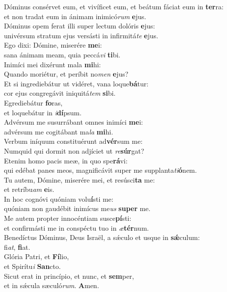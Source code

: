 \evenverse Dóminus consérvet eum, et vivíficet eum, et beátum fáciat eum in \textbf{ter}ra:~\*\\
\evenverse et non tradat eum in ánimam inimicó\textit{rum} \textbf{e}jus.\\
\oddverse Dóminus opem ferat illi super lectum dolóris \textbf{e}jus:~\*\\
\oddverse univérsum stratum ejus versásti in infirmitá\textit{te} \textbf{e}jus.\\
\evenverse Ego dixi: Dómine, miserére \textbf{me}i:~\*\\
\evenverse sana ánimam meam, quia peccá\textit{vi} \textbf{ti}bi.\\
\oddverse Inimíci mei dixérunt mala \textbf{mi}hi:~\*\\
\oddverse Quando moriétur, et períbit no\textit{men} \textbf{e}jus?\\
\evenverse Et si ingrediebátur ut vidéret, vana loque\textbf{bá}tur:~\*\\
\evenverse cor ejus congregávit iniquitá\textit{tem} \textbf{si}bi.\\
\oddverse Egrediebátur \textbf{fo}ras,~\*\\
\oddverse et loquebátur in \textit{i}\textbf{dí}psum.\\
\evenverse Advérsum me susurrábant omnes inimíci \textbf{me}i:~\*\\
\evenverse advérsum me cogitábant ma\textit{la} \textbf{mi}hi.\\
\oddverse Verbum iníquum constituérunt ad\textbf{vér}sum me:~\*\\
\oddverse Numquid qui dormit non adjíciet ut \textit{re}\textbf{súr}gat?\\
\evenverse Etenim homo pacis meæ, in quo spe\textbf{rá}vi:~\*\\
\evenverse qui edébat panes meos, magnificávit super me supplanta\textit{ti}\textbf{ó}nem.\\
\oddverse Tu autem, Dómine, miserére mei, et resúsci\textbf{ta} me:~\*\\
\oddverse et retríbu\textit{am} \textbf{e}is.\\
\evenverse In hoc cognóvi quóniam volu\textbf{í}sti me:~\*\\
\evenverse quóniam non gaudébit inimícus me\textit{us} \textbf{su}\textbf{per} me.\\
\oddverse Me autem propter innocéntiam susce\textbf{pí}sti:~\*\\
\oddverse et confirmásti me in conspéctu tuo in \textit{æ}\textbf{tér}num.\\
\evenverse Benedíctus Dóminus, Deus Israël, a sǽculo et usque in \textbf{sǽ}culum:~\*\\
\evenverse fi\textit{at}, \textbf{fi}at.\\
\oddverse Glória Patri, et \textbf{Fí}lio,~\*\\
\oddverse et Spirítu\textit{i} \textbf{San}cto.\\
\evenverse Sicut erat in princípio, et nunc, et \textbf{sem}per,~\*\\
\evenverse et in sǽcula sæculó\textit{rum}. \textbf{A}men.\\
